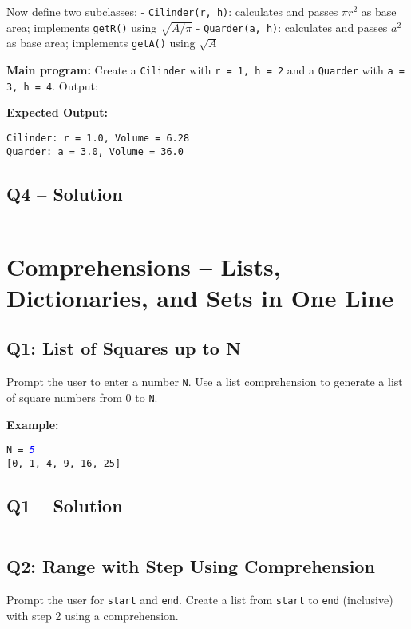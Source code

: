 \documentclass[a4paper,11pt]{article}
\begin{document}
Now define two subclasses:
- \texttt{Cilinder(r, h)}: calculates and passes $\pi r^2$ as base area; implements \texttt{getR()} using $\sqrt{A/\pi}$
- \texttt{Quarder(a, h)}: calculates and passes $a^2$ as base area; implements \texttt{getA()} using $\sqrt{A}$

\textbf{Main program:}
Create a \texttt{Cilinder} with \texttt{r = 1, h = 2} and a \texttt{Quarder} with \texttt{a = 3, h = 4}. Output:

\textbf{Expected Output:}
\begin{flushleft}
	\texttt{Cilinder: r = 1.0, Volume = 6.28}\\
	\texttt{Quarder: a = 3.0, Volume = 36.0}
\end{flushleft}


\subsection*{Q4 – Solution}
\inputminted{python}{Files/10/4.py}

\newpage
\section{Comprehensions – Lists, Dictionaries, and Sets in One Line}

\subsection*{Q1: List of Squares up to N}
Prompt the user to enter a number \texttt{N}. Use a list comprehension to generate a list of square numbers from 0 to \texttt{N}.

\textbf{Example:}
\begin{flushleft}
	\texttt{N = \textcolor{blue}{\textit{5}}}\\
	\texttt{[0, 1, 4, 9, 16, 25]}
\end{flushleft}


\subsection*{Q1 – Solution}
\inputminted{python}{Files/11/1.py}

\subsection*{Q2: Range with Step Using Comprehension}
Prompt the user for \texttt{start} and \texttt{end}. Create a list from \texttt{start} to \texttt{end} (inclusive) with step 2 using a comprehension.
\end{document}
